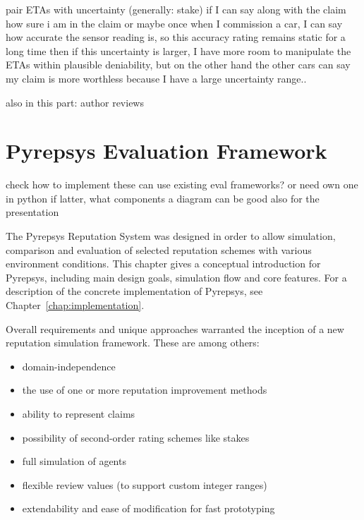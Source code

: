 \documentclass[%
    ]{\PathToTumTemplate/thesis/tum_thesis}
\begin{document}
pair ETAs with uncertainty (generally: stake)
if I can say along with the claim how sure i am in the claim
or maybe once when I commission a car, I can say how accurate the sensor reading is, so this accuracy rating remains static for a long time
then if this uncertainty is larger, I have more room to manipulate the ETAs within plausible deniability, but on the other hand the other cars can say my claim is more worthless because I have a large uncertainty range..


also in this part: author reviews




\section{Pyrepsys Evaluation Framework}\label{sec:approach_evaluation_framework}

check how to implement these
can use existing eval frameworks? or need own one in python
if latter, what components
a diagram can be good also for the presentation



The Pyrepsys Reputation System was designed in order to allow simulation, comparison and evaluation of selected reputation schemes with various environment conditions. 
This chapter gives a conceptual introduction for Pyrepsys, including main design goals, simulation flow and core features.
For a description of the concrete implementation of Pyrepsys, see Chapter~\ref{chap:implementation}.

Overall requirements and unique approaches warranted the inception of a new reputation simulation framework. 
These are among others:
\begin{itemize}
    \item domain-independence
    \item the use of one or more reputation improvement methods
    \item ability to represent \glspl{claim}
    \item possibility of second-order rating schemes like stakes
    \item full simulation of agents
    \item flexible review values (to support custom integer ranges)
    \item extendability and ease of modification for fast prototyping
\end{itemize}
\end{document}
